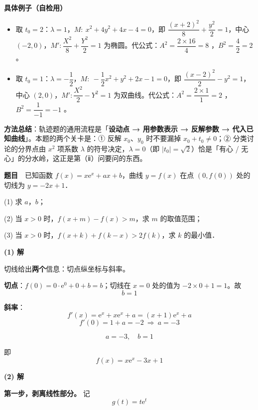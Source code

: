 \begin{gktip}
\textbf{具体例子（自检用）}
\begin{itemize}
\item 取 $t_0=2$：$\lambda=1$，$M:\ x^2+4y^2+4x-4=0$，即 $\dfrac{(x+2)^2}{8}+\dfrac{y^2}{2}=1$，中心 $(-2,0)$，$M':\dfrac{X^2}{8}+\dfrac{Y^2}{2}=1$ 为椭圆。代公式：$A^2=\dfrac{2\times16}{4}=8$ ，$B^2=\dfrac{4}{2}=2$ 。
\item 取 $t_0=1$：$\lambda=-\dfrac12$，$M:\ -\dfrac12x^2+y^2+2x-1=0$，即 $\dfrac{(x-2)^2}{2}-y^2=1$，中心 $(2,0)$，$M':\dfrac{X^2}{2}-Y^2=1$ 为双曲线。代公式：$A^2=\dfrac{2\times1}{1}=2$ ，$B^2=\dfrac{1}{-1}=-1$ 。
\end{itemize}

\textbf{方法总结}：轨迹题的通用流程是「\textbf{设动点 → 用参数表示 → 反解参数 → 代入已知曲线}」。本题的两个关卡是：① 反解 $x_0$、$y_0$ 时不要漏掉 $x_0+t_0\ne0$；② 分类讨论的分界点由 $x^2$ 项系数 $\lambda$ 的符号决定，$\lambda=0$（即 $\left|t_0\right|=\sqrt2$）恰是「有心 / 无心」的分水岭，这正是第（ⅱ）问要问的东西。
\end{gktip}

\par\medskip


\textbf{题目}　已知函数 $f(x)=x\mathrm{e}^x+ax+b$，曲线 $y=f(x)$ 在点 $\left(0,f(0)\right)$ 处的切线为 $y=-2x+1$．

  (1) 求 $a$，$b$；

  (2) 当 $x>0$ 时，$f(x+m)-f(x)>m$，求 $m$ 的取值范围；

  (3) 当 $x>0$ 时，$f(x+k)+f(k-x)>2f(k)$，求 $k$ 的最小值．

\par\medskip

\textbf{(1) 解}

切线给出\textbf{两个}信息：切点纵坐标与斜率。

\textbf{切点}：$f(0)=0\cdot\mathrm e^0+0+b=b$；切线在 $x=0$ 处的值为 $-2\times0+1=1$。故
\[b=1\]

\textbf{斜率}：
\[f'(x)=\mathrm e^x+x\mathrm e^x+a=(x+1)\mathrm e^x+a\]
\[f'(0)=1+a=-2\ \Longrightarrow\ a=-3\]

\[\boxed{a=-3,\quad b=1}\]

即
\[f(x)=x\mathrm e^x-3x+1\]

\par\medskip

\textbf{(2) 解}

\textbf{第一步，剥离线性部分。} 记
\[g(t)=t\mathrm e^{t}\]

